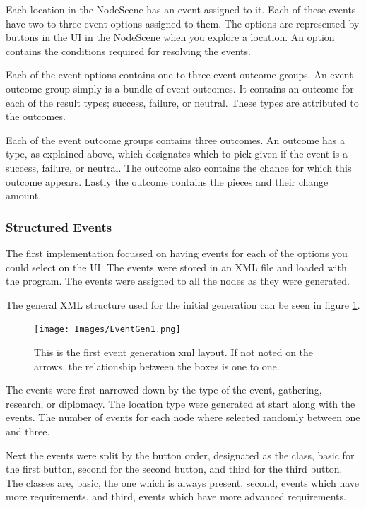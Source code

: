 Each location in the NodeScene has an event assigned to it. 
Each of these events have two to three event options assigned to them. The options are represented by buttons in the UI in the NodeScene when you explore a location. An option contains the conditions required for resolving the events. 

Each of the event options contains one to three event outcome groups. An event outcome group simply is a bundle of event outcomes. It contains an outcome for each of the result types; success, failure, or neutral. These types are attributed to the outcomes.

Each of the event outcome groups contains three outcomes. An outcome has a type, as explained above, which designates which to pick given if the event is a success, failure, or neutral. The outcome also contains the chance for which this outcome appears. Lastly the outcome contains the pieces and their change amount. 

\subsubsection{Structured Events}
The first implementation focussed on having events for each of the options you could select on the UI. The events were stored in an XML file and loaded with the program. The events were assigned to all the nodes as they were generated.

The general XML structure used for the initial generation can be seen in figure \ref{fig:eGen1}.

\begin{figure}[!ht]
    \centering
    \texttt{[image: Images/EventGen1.png]}
    \caption{This is the first event generation xml layout. If not noted on the arrows, the relationship between the boxes is one to one.}
    \label{fig:eGen1}
\end{figure}

The events were first narrowed down by the type of the event, gathering, research, or diplomacy. The location type were generated at start along with the events. The number of events for each node where selected randomly between one and three.

Next the events were split by the button order, designated as the class, basic for the first button, second for the second button, and third for the third button. 
The classes are, basic, the one which is always present, second, events which have more requirements, and third, events which have more advanced requirements. 

